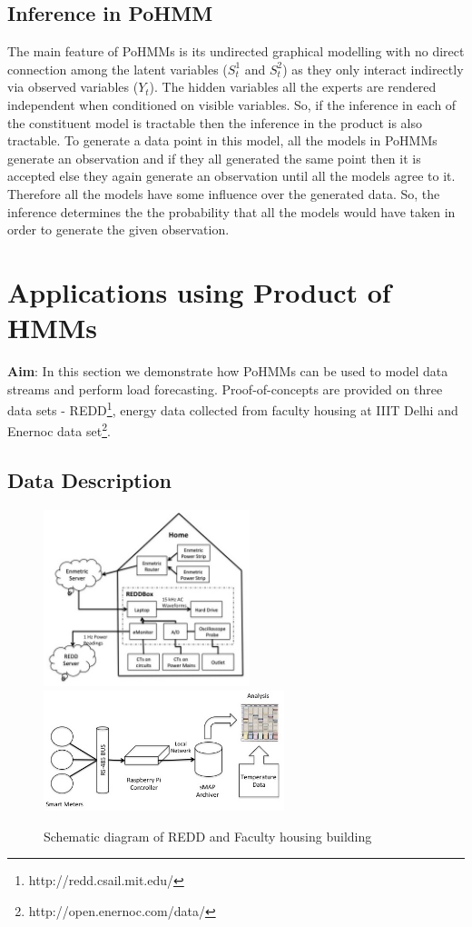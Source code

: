 \documentclass{acm_proc_article-sp}
\begin{document}
 \subsection{Inference in PoHMM}

The main feature of PoHMMs is its undirected graphical modelling with no direct connection among the latent variables ($S^1_{t}$ and $S^2_{t}$) as they only interact indirectly via observed variables ($Y_{t}$). The hidden variables all the experts are rendered independent when conditioned on visible variables. So, if the inference in each of the constituent model is tractable then the inference in the product is also tractable. To generate a data point in this model, all the models in PoHMMs generate an observation and if they all generated the same point then it is accepted else they again generate an observation until all the models agree to it. Therefore all the models have some influence over the generated data. So, the inference determines the the probability that all the models would have taken in order to generate the given observation. 



\section{Applications using Product of HMMs}
\label{poc}

\textbf{Aim}: In this section we demonstrate how PoHMMs can be used to model data streams and perform load forecasting. Proof-of-concepts are provided on three data sets - REDD\footnote{http://redd.csail.mit.edu/}, energy data collected from faculty housing at IIIT Delhi and Enernoc data set\footnote{http://open.enernoc.com/data/}.

\subsection{Data Description} 
\begin{figure}
\centering
\includegraphics[width=6cm]{./REDD_img}
\includegraphics[width=7cm]{./FHschema}
\caption{Schematic diagram of REDD and Faculty housing building}
\label{fig:FH}
\end{figure}
\end{document}
